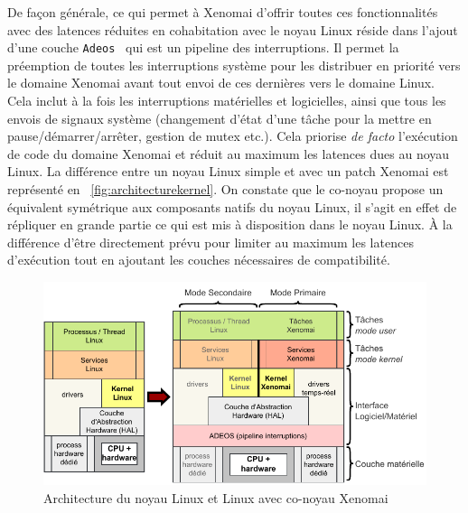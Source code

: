 \documentclass[french, a4paper, 11pt, twoside, pdftex]{StyleThese}
\begin{document}
    	De façon générale, ce qui permet à Xenomai d'offrir toutes ces fonctionnalités avec des latences réduites en cohabitation avec le noyau Linux réside dans l'ajout d'une couche \texttt{Adeos}~\cite{gerum_life_2005} qui est un pipeline des  interruptions. Il permet la préemption de toutes les interruptions système pour les distribuer en priorité vers le domaine Xenomai avant tout envoi de ces dernières vers le domaine Linux. Cela inclut à la fois les interruptions matérielles et logicielles, ainsi que tous les envois de signaux système (changement d'état d'une tâche pour la mettre en pause/démarrer/arrêter, gestion de mutex etc.). Cela priorise \textit{de facto} l'exécution de code du domaine Xenomai et réduit au maximum les latences dues au noyau Linux. La différence entre un noyau Linux simple et avec un patch Xenomai est représenté en ~\autoref{fig:architecturekernel}. On constate que le co-noyau propose un équivalent symétrique aux composants natifs du noyau Linux, il s'agit en effet de répliquer en grande partie ce qui est mis à disposition dans le noyau Linux. À la différence d'être directement prévu pour limiter au maximum les latences d'exécution tout en ajoutant les couches nécessaires de compatibilité.

		\begin{figure}[h]
			\centering
			\includegraphics[width=\linewidth]{schemas/Architecture_kernel}
			\caption[Architecture co-noyau Linux et Xenomai]{Architecture du noyau Linux et Linux avec co-noyau Xenomai}
			\label{fig:architecturekernel}
		\end{figure}
    	
\end{document}
